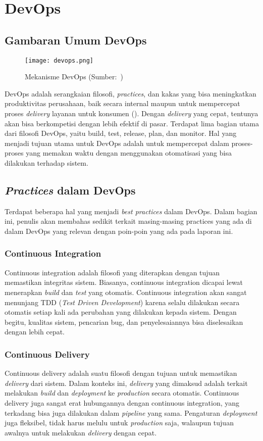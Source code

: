 \section{DevOps}

\subsection{Gambaran Umum DevOps}
\begin{figure}[h]
  \centering
  \texttt{[image: devops.png]}
  \caption{Mekanisme DevOps (Sumber:~\cite{devops})}
\end{figure}
DevOps adalah serangkaian filosofi, \textit{practices}, dan kakas yang bisa meningkatkan produktivitas perusahaan, baik secara internal maupun untuk mempercepat proses \textit{delivery} layanan untuk konsumen (\cite{devops}).
Dengan \textit{delivery} yang cepat, tentunya akan bisa berkompetisi dengan lebih efektif di pasar.
Terdapat lima bagian utama dari filosofi DevOps, yaitu build, test, release, plan, dan monitor.
Hal yang menjadi tujuan utama untuk DevOps adalah untuk mempercepat dalam proses-proses yang memakan waktu dengan menggunakan otomatisasi yang bisa dilakukan terhadap sistem.

\subsection{\textit{Practices} dalam DevOps}
Terdapat beberapa hal yang menjadi \textit{best practices} dalam DevOps. 
Dalam bagian ini, penulis akan membahas sedikit terkait masing-masing practices yang ada di dalam DevOps yang relevan dengan poin-poin yang ada pada laporan ini.

\subsubsection{Continuous Integration}
Continuous integration adalah filosofi yang diterapkan dengan tujuan memastikan integritas sistem.
Biasanya, continuous integration dicapai lewat menerapkan \textit{build} dan \textit{test} yang otomatis.
Continuous integration akan sangat menunjang TDD (\textit{Test Driven Development}) karena selalu dilakukan secara otomatis setiap kali ada perubahan yang dilakukan kepada sistem.
Dengan begitu, kualitas sistem, pencarian bug, dan penyelesaiannya bisa diselesaikan dengan lebih cepat.


\subsubsection{Continuous Delivery}
Continuous delivery adalah suatu filosofi dengan tujuan untuk memastikan \textit{delivery} dari sistem.
Dalam konteks ini, \textit{delivery} yang dimaksud adalah terkait melakukan \textit{build} dan \textit{deployment} ke \textit{production} secara otomatis.
Continuous delivery juga sangat erat hubungannya dengan continuous integration, yang terkadang bisa juga dilakukan dalam \textit{pipeline} yang sama.
Pengaturan \textit{deployment} juga fleksibel, tidak harus melulu untuk \textit{production} saja, walaupun tujuan awalnya untuk melakukan \textit{delivery} dengan cepat.


